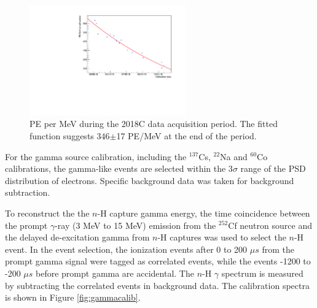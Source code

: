 \begin{figure}[ht]
\centering
\includegraphics[width=0.6\textwidth]{Figures/PEvsTime.pdf}
\caption{PE per MeV during the 2018C data acquisition period. The fitted function suggests 346$\pm$17 PE/MeV at the end of the period.}
\label{fig:PEvTime}
\end{figure}

For the gamma source calibration, including the $^{137}$Cs, $^{22}$Na and $^{60}$Co calibrations, the gamma-like events are selected within the 3$\sigma$ range of the PSD distribution of electrons.
Specific background data was taken for background subtraction.

To reconstruct the the $n$-H capture gamma energy, the time coincidence between the prompt $\gamma$-ray (3 MeV to 15 MeV) emission from the $^{252}$Cf neutron source and the delayed de-excitation gamma from $n$-H captures was used to select the $n$-H event.
In the event selection, the ionization events after 0 to 200 $\mu s$ from the prompt gamma signal were tagged as correlated events, while the events -1200 to -200 $\mu s$ before prompt gamma are accidental.
The $n$-H $\gamma$ spectrum is measured by subtracting the correlated events in background data.
The calibration spectra is shown in Figure \ref{fig:gammacalib}.

